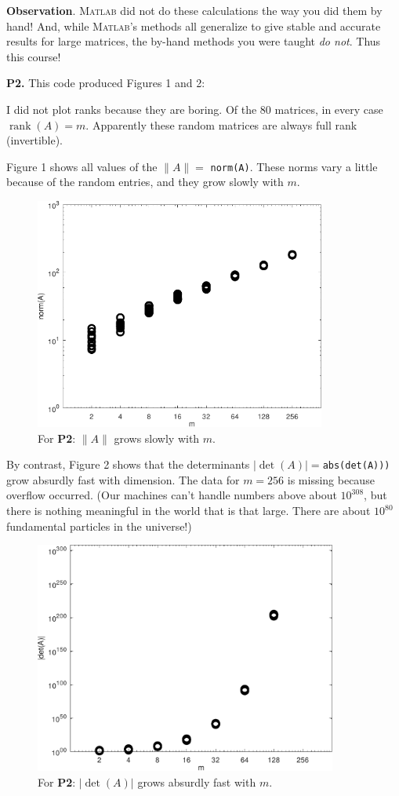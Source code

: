 \documentclass[11pt]{amsart}
\newcommand{\rank}{\operatorname{rank}}
\newcommand{\Matlab}{\textsc{Matlab}\xspace}
\newcommand{\mfile}[1]{
\begin{quote}
\bigskip
\VerbatimInput[frame=single,framesep=3mm,label=\fbox{\normalsize \textsl{\,#1\,}},fontfamily=courier,fontsize=\footnotesize]{../matlab/#1}
\medskip
\end{quote}
}
\newcommand{\prob}[1]{\bigskip\noindent\large\textbf{#1.} \normalsize}
\begin{document}
\medskip
\noindent \textbf{Observation}. \Matlab did not do these calculations the way you did them by hand!  And, while \Matlab's methods all generalize to give stable and accurate results for large matrices, the by-hand methods you were taught \emph{do not}.  Thus this course!


\prob{P2}  This code produced Figures 1 and 2:

\mfile{matstats.m}

I did not plot ranks because they are boring.  Of the 80 matrices, in every case $\rank(A)=m$.  Apparently these random matrices are always full rank (invertible).

Figure 1 shows all values of the $\|A\|=$ \texttt{norm(A)}.  These norms vary a little because of the random entries, and they grow slowly with $m$.

\begin{figure}[h]
\includegraphics[height=3in,keepaspectratio=true]{a1p2norms}
\caption{For \textbf{P2}:  $\|A\|$ grows slowly with $m$.}
\end{figure}

By contrast, Figure 2 shows that the determinants $|\det(A)| = $\texttt{abs(det(A)))} grow absurdly fast with dimension.  The data for $m=256$ is missing because overflow occurred.  (Our machines can't handle numbers above about $10^{308}$, but there is nothing meaningful in the world that is that large.  There are about $10^{80}$ fundamental particles in the universe!)

\begin{figure}[h]
\includegraphics[height=3in,keepaspectratio=true]{a1p2dets}
\caption{For \textbf{P2}:  $|\det(A)|$ grows absurdly fast with $m$.}
\end{figure}
\end{document}
